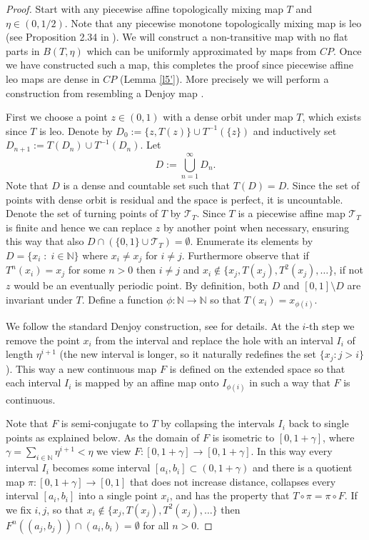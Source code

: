 \documentclass[12pt, a4paper]{amsart}
\def\N{{\mathbb N}}
\newcommand{\?}{{\bf ???}}
\begin{document}
\begin{proof} 
Start with 
any piecewise affine topologically mixing map $T$ and $\eta \in (0,1/2)$. Note that any piecewise monotone topologically mixing map is leo (see Proposition 2.34 in \cite{R}). 
We will construct a non-transitive map with no flat parts in $B(T,\eta)$ which can be uniformly approximated by maps from $CP$.  Once we have constructed such a map, this completes the proof since piecewise affine leo maps are dense in $CP$ (Lemma \ref{l5'}).
More precisely we will perform a construction from \cite[Example~4.6]{KO} resembling a Denjoy map \cite[Example~14.9]{Devaney}.

First we choose a point $z\in (0,1)$ with a dense orbit under map $T$, which exists since $T$ is leo. Denote by $D_0:=\{z,T(z)\}\cup T^{-1}(\{z\})$ and inductively set
$D_{n+1}:=T(D_n)\cup T^{-1}(D_n)$. Let
$$
D:=\bigcup_{n=1}^\infty D_n.
$$
 Note that $D$ is a dense and countable set such that $T(D)=D$. Since the set of points with dense orbit is residual and the space is perfect, it is uncountable. Denote the set of turning points of $T$ by $\mathcal{T}_T$. Since $T$ is a piecewise affine map $\mathcal{T}_T$ is finite and hence we can replace $z$ by another point when necessary, ensuring this way that also $D\cap (\{0,1\}\cup \mathcal{T}_T)=\emptyset$.
Enumerate its elements by $D=\{x_i\; : \; i\in \N\}$ where $x_i\neq x_j$ for $i\neq j$.
Furthermore observe that if $T^n(x_i)=x_j$ for some $n>0$ then $i\neq j$ and $x_i\notin \{x_j,T(x_j),T^2(x_j),\ldots\}$, if not $z$ would be an eventually periodic point.
By definition, both $D$ and $[0,1]\setminus D$ are invariant under $T$. Define a function $\phi \colon \N \to \N$ so that $T(x_i)=x_{\phi(i)}$.

We follow the standard Denjoy construction, see \cite{Devaney} for details.
At the $i$-th step we remove the point $x_i$ from the interval and replace the hole with an interval $I_i$ of length  $\eta^{i+1}$ (the new interval is longer, so it 
naturally redefines the set $\{x_j : j> i\}$). This way a new continuous map $F$ is defined on the extended space so that each interval $I_i$ is mapped by an affine map 
 onto $I_{\phi(i)}$ in such a way that $F$ is continuous.
 
 Note that $F$ is semi-conjugate to $T$ by collapsing  the intervals $I_i$ back to single points as explained below.
As the domain of $F$ is isometric to $[0,1+\gamma]$, where $\gamma=\sum_{i\in \N}\eta^{i+1} < \eta$ we view $F\colon [0,1+\gamma]\to [0,1+\gamma]$. In this way every interval $I_i$ becomes some interval $[a_i,b_i]\subset (0,1+\gamma)$ and there is a quotient map $\pi\colon [0,1+\gamma]\to [0,1]$ that does not increase distance, collapses every interval $[a_i,b_i]$ into a single point $x_i$, and has the property that $T\circ \pi=\pi\circ F$. If we fix $i,j$, so that $x_i\not\in \{x_j,T(x_j),T^2(x_j),\ldots\}$ then $F^n((a_j,b_j))\cap (a_i,b_i)=\emptyset$ for all $n>0$.


\end{proof}
\end{document}
